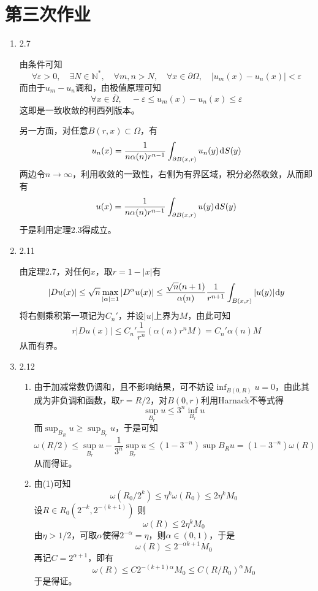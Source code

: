 \documentclass[a4paper,UTF8,fontset=windows,10pt]{ctexart}
\newcommand*{\dr}{\hspace{0.07em}\mathrm{d}}
\begin{document}
\section{第三次作业}
\begin{enumerate}
    \item 2.7
    
    由条件可知
    $$\forall\varepsilon>0,\quad\exists N\in\mathbb{N}^*,\quad\forall m,n>N,\quad\forall x\in\partial\Omega,\quad|u_m(x)-u_n(x)|<\varepsilon$$
    而由于$u_m-u_n$调和，由极值原理可知
    $$\forall x\in\bar{\Omega},\quad-\varepsilon\le u_m(x)-u_n(x)\le\varepsilon$$
    这即是一致收敛的柯西列版本。
    
    另一方面，对任意$B(r,x)\subset\Omega$，有
    $$u_n(x)=\frac{1}{n\alpha(n)r^{n-1}}\int_{\partial B(x,r)}u_n(y)\dr S(y)$$
    两边令$n\to\infty$，利用收敛的一致性，右侧为有界区域，积分必然收敛，从而即有
    $$u(x)=\frac{1}{n\alpha(n)r^{n-1}}\int_{\partial B(x,r)}u(y)\dr S(y)$$
    于是利用定理2.3得成立。
    
    \item 2.11
    
    由定理2.7，对任何$x$，取$r=1-|x|$有
    $$|Du(x)|\le\sqrt{n}\max_{|\alpha|=1}|D^\alpha u(x)|\le\frac{\sqrt{n}(n+1)}{\alpha(n)}\frac{1}{r^{n+1}}\int_{B(x,r)}|u(y)|\dr y$$
    将右侧乘积第一项记为$C_n'$，并设$|u|$上界为$M$，由此可知
    $$r|Du(x)|\le C_n'\frac{1}{r^n}(\alpha(n)r^nM)=C_n'\alpha(n)M$$
    从而有界。
    
    \item 2.12
    \begin{enumerate}[(1)]
        \item 由于加减常数仍调和，且不影响结果，可不妨设$\inf_{B(0,R)}u=0$，由此其成为非负调和函数，取$r=R/2$，对$B(0,r)$利用Harnack不等式得
        $$\sup_{B_r}u\le 3^n\inf_{B_r}u$$
        而$\sup_{B_R}u\ge\sup_{B_r}u$，于是可知
        $$\omega(R/2)\le\sup_{B_r}u-\frac{1}{3^n}\sup_{B_r}u\le(1-3^{-n})\sup B_Ru=(1-3^{-n})\omega(R)$$
        从而得证。
    
        \item 由(1)可知
        $$\omega(R_0/2^k)\le\eta^k\omega(R_0)\le2\eta^kM_0$$
        设$R\in R_0(2^{-k},2^{-(k+1)})$
        则
        $$\omega(R)\le2\eta^kM_0$$
        由$\eta>1/2$，可取$\alpha$使得$2^{-\alpha}=\eta$，则$\alpha\in(0,1)$，于是
        $$\omega(R)\le2^{-\alpha k+1}M_0$$
        再记$C=2^{\alpha+1}$，即有
        $$\omega(R)\le C2^{-(k+1)\alpha}M_0\le C(R/R_0)^\alpha M_0$$
        于是得证。
    \end{enumerate}
    

\end{enumerate}
\end{document}

